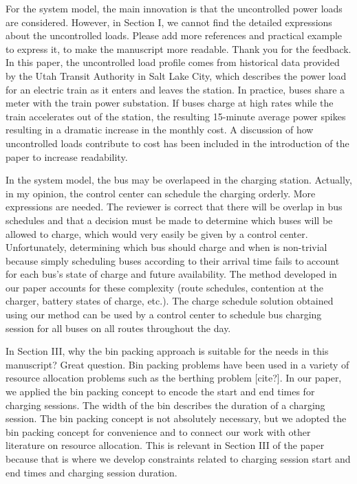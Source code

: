 \documentclass{article}
\begin{document}
\begin{buttkissing}
	\reviewerclaims For the system model, the main innovation is that the uncontrolled power loads are considered. However, in Section I, we cannot find the detailed expressions about the uncontrolled loads. Please add more references and practical example to express it, to make the manuscript more readable.
	\kissbutt Thank you for the feedback. In this paper, the uncontrolled load profile comes from historical data provided by the Utah Transit Authority in Salt Lake City, which describes the power load for an electric train as it enters and leaves the station. In practice, buses share a meter with the train power substation. If buses charge at high rates while the train accelerates out of the station, the resulting 15-minute average power spikes resulting in a dramatic increase in the monthly cost.  A discussion of how uncontrolled loads contribute to cost has been included in the introduction of the paper to increase readability.
	
	\reviewerclaims In the system model, the bus may be overlapeed in the charging station. Actually, in my opinion, the control center can schedule the charging orderly. More expressions are needed.
	\kissbutt The reviewer is correct that there will be overlap in bus schedules and that a decision must be made to determine which buses will be allowed to charge, which would very easily be given by a control center. Unfortunately, determining which bus should charge and when is non-trivial because simply scheduling buses according to their arrival time fails to account for each bus's state of charge and future availability.  The method developed in our paper accounts for these complexity (route schedules, contention at the charger, battery states of charge, etc.).  The charge schedule solution obtained using our method can be used by a control center to schedule bus charging session for all buses on all routes throughout the day.
	
	\reviewerclaims In Section III, why the bin packing approach is suitable for the needs in this manuscript?
	\kissbutt Great question. Bin packing problems have been used in a variety of resource allocation problems such as the berthing problem [cite?]. In our paper, we applied the bin packing concept to encode the start and end times for charging sessions.  The width of the bin describes the duration of a charging session.  The bin packing concept is not absolutely necessary, but we adopted the bin packing concept for convenience and to connect our work with other literature on resource allocation.  This is relevant in Section III of the paper because that is where we develop constraints related to charging session start and end times and charging session duration.
	

\end{buttkissing}
\end{document}
